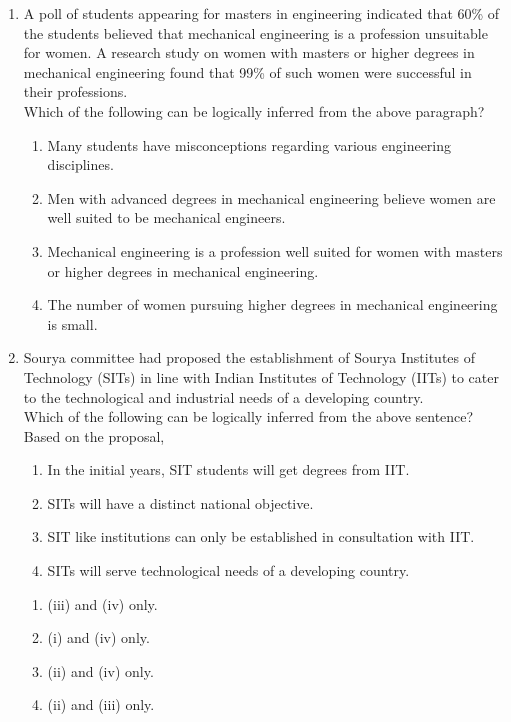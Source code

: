\documentclass[journal]{IEEEtran}
\begin{document}
\begin{enumerate}
\item A poll of students appearing for masters in engineering indicated that 60\% of the students believed that mechanical engineering is a profession unsuitable for women. A research study on women with
masters or higher degrees in mechanical engineering found that 99\% of such women were successful in their professions.\\
Which of the following can be logically inferred from the above paragraph?
\begin{enumerate}
    \item Many students have misconceptions regarding various engineering disciplines.
    \item Men with advanced degrees in mechanical engineering believe women are well suited to be mechanical engineers.
    \item Mechanical engineering is a profession well suited for women with masters or higher degrees in mechanical engineering.
    \item The number of women pursuing higher degrees in mechanical engineering is small.
\end{enumerate}

\item Sourya committee had proposed the establishment of Sourya Institutes of Technology (SITs) in line with Indian Institutes of Technology (IITs) to cater to the technological and industrial needs of a developing country. \\
Which of the following can be logically inferred from the above sentence?\\
Based on the proposal,
\begin{enumerate}[label = (\roman*)]
    \item In the initial years, SIT students will get degrees from IIT.
    \item SITs will have a distinct national objective.
    \item SIT like institutions can only be established in consultation with IIT.
    \item SITs will serve technological needs of a developing country.
\end{enumerate}
\begin{multicols}{2}
    \begin{enumerate}
        \item (iii) and (iv) only.
        \item (i) and (iv) only. 
        \item (ii) and (iv) only. 
        \item (ii) and (iii) only. 
    \end{enumerate}
\end{multicols}


\end{enumerate}
\end{document}
